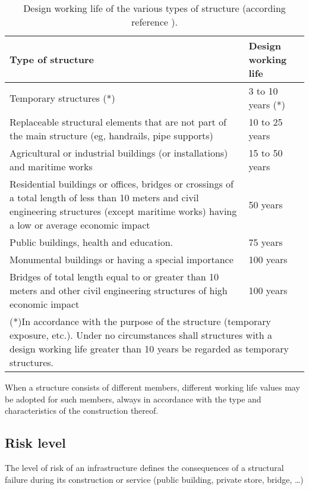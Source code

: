 \begin{table}
\begin{center}
\begin{small}
\begin{tabular}{|p{6cm}|l|}
\hline
\textbf{Type of structure} & \textbf{Design working life} \\
\hline
Temporary structures (*) & 3 to 10 years (*) \\
\hline
Replaceable structural elements that are not part of the main structure (eg, handrails, pipe supports) & 10 to 25 years \\
\hline
Agricultural or industrial buildings (or installations) and maritime works & 15 to 50 years\\
\hline
Residential buildings or offices, bridges or crossings of a total length of less than 10 meters and civil engineering structures (except maritime works) having a low or average economic impact & 50 years \\
\hline
Public buildings, health and education. & 75 years\\
\hline
Monumental buildings or having a special importance & 100 years \\
\hline
Bridges of total length equal to or greater than 10 meters and other civil engineering structures of high economic impact & 100 years \\
\hline
\multicolumn{2}{|p{9.5cm}|}{(*)In accordance with the purpose of the structure (temporary exposure, etc.). Under no circumstances shall structures with a design working life greater than 10 years be regarded as temporary structures.} \\
\hline
\end{tabular}
\caption{Design working life of the various types of structure (according reference \cite{EAE}).} \label{tb_vid_util}
\end{small}
\end{center}
\end{table}
When a structure consists of different members, different working life values may be adopted for such members, always in accordance with the type and characteristics of the construction thereof.

\subsection{Risk level}
The level of risk of an infrastructure defines the consequences of a structural failure during its construction or service (public building, private store, bridge, \ldots)

